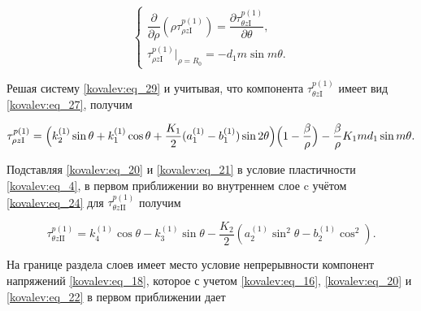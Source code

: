  \begin{equation}\label{kovalev:eq_29}

  \left\{

  \begin{array}{l}

    \dfrac{\partial}{\partial\rho}(\rho\tau_{\rho z\mathrm{I}}^{p(1)})=\dfrac{\partial\tau_{\theta z\mathrm{I}}^{p(1)}}{\partial\theta}, \\[5mm]

\tau_{\rho z\mathrm{I}}^{p(1)}\bigr|_{\rho=R_0}=-d_1m\sin m\theta.

  \end{array}

  \right.

 \end{equation} 	



Решая систему \eqref{kovalev:eq_29} и учитывая, что компонента  $\tau_{\theta z\mathrm{I}}^{p(1)}$ имеет вид \eqref{kovalev:eq_27}, получим

 \begin{equation}\label{kovalev:eq_30}

\tau_{\rho z\mathrm{I}}^{p(1)} =   

\Bigl( k_2^{(1)} \sin\theta +k_1^{(1)} \cos\theta +\dfrac{K_1}{2}(a_1^{(1)}-b_1^{(1)})\sin2\theta \Bigr)

  \Bigl(1-\dfrac{\beta}{\rho}\Bigr)- \dfrac{\beta}{\rho}K_1md_1\sin m\theta.

 \end{equation}



Подставляя \eqref{kovalev:eq_20} и \eqref{kovalev:eq_21} в условие пластичности \eqref{kovalev:eq_4}, в первом приближении во внутреннем слое  c учётом \eqref{kovalev:eq_24} для $\tau_{\theta z\mathrm{II}}^{p(1)}$ получим 

  \begin{equation}

	\label{kovalev:eq_31}

    \tau_{\theta z\mathrm{II}}^{p(1)}=k_4^{(1)}\cos\theta-k_3^{(1)}\sin\theta-\dfrac{K_2}{2}

    (a_2^{(1)}\sin^2\theta-b_2^{(1)}\cos^2).

  \end{equation}



На границе раздела слоев имеет место условие непрерывности компонент напряжений \eqref{kovalev:eq_18}, которое с учетом \eqref{kovalev:eq_16}, \eqref{kovalev:eq_20} и \eqref{kovalev:eq_22}  в первом приближении дает 

